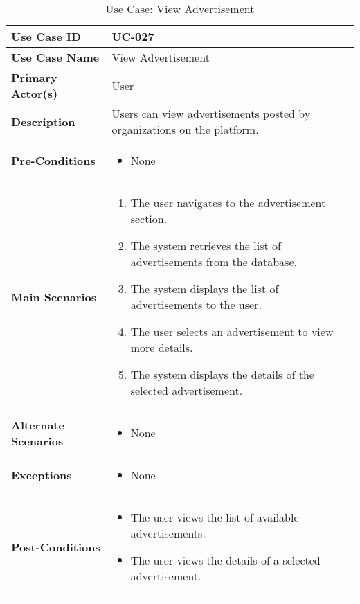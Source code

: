\begin{table}[!ht]
    \centering
    \renewcommand{\arraystretch}{1.3} %
    \begin{tabularx}{\textwidth}{|l|X|}
        \hline
        \textbf{Use Case ID} & UC-027 \\
        \hline
        \textbf{Use Case Name} & View Advertisement \\
        \hline
        \textbf{Primary Actor(s)} & User \\
        \hline
        \textbf{Description} & Users can view advertisements posted by organizations on the platform. \\
        \hline
        \textbf{Pre-Conditions} & 
        \begin{itemize}[label=--,itemsep=0pt]
            \item None
        \end{itemize} \\
        \hline
        \textbf{Main Scenarios} & 
        \begin{enumerate}[label=\arabic*.,itemsep=0pt]
            \item The user navigates to the advertisement section.
            \item The system retrieves the list of advertisements from the database.
            \item The system displays the list of advertisements to the user.
            \item The user selects an advertisement to view more details.
            \item The system displays the details of the selected advertisement.
        \end{enumerate} \\
        \hline
        \textbf{Alternate Scenarios} & 
        \begin{itemize}[label=--,itemsep=0pt]
            \item None
        \end{itemize} \\
        \hline
        \textbf{Exceptions} & 
        \begin{itemize}[label=--,itemsep=0pt]
            \item None
        \end{itemize} \\
        \hline
        \textbf{Post-Conditions} & 
        \begin{itemize}[label=--,itemsep=0pt]
            \item The user views the list of available advertisements.
            \item The user views the details of a selected advertisement.
        \end{itemize} \\
        \hline
    \end{tabularx}
    \caption{Use Case: View Advertisement}
    \label{tab:use-case-view-advertisement}
\end{table}


